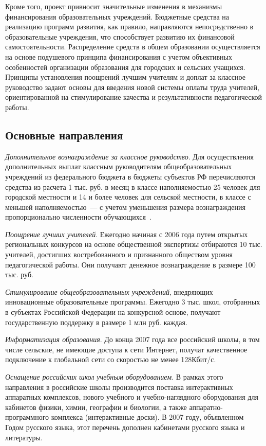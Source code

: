 \documentclass[article, 12pt, russian, oneside]{ncc}
\begin{document}
Кроме того, проект привносит значительные изменения в механизмы
финансирования образовательных учреждений. Бюджетные средства на
реализацию программ развития, как правило, направляются
непосредственно в образовательные учреждения, что способствует
развитию их финансовой самостоятельности. Распределение средств в
общем образовании осуществляется на основе подушевого принципа
финансирования с учетом объективных особенностей организации
образования для городских и сельских учащихся. Принципы установления
поощрений лучшим учителям и доплат за классное руководство задают
основы для введения новой системы оплаты труда учителей,
ориентированной на стимулирование качества и результативности
педагогической работы.

\subsection{Основные направления}

\emph{Дополнительное вознаграждение за классное руководство}. Для
осуществления дополнительных выплат классным руководителям
общеобразовательных учреждений из федерального бюджета в бюджеты
субъектов РФ перечисляются средства из расчета 1 тыс. руб. в месяц в
классе наполняемостью 25 человек для городской местности и 14 и более
человек для сельской местности, в классе с меньшей наполняемостью~---
с учетом уменьшения размера вознаграждения пропорционально численности
обучающихся~\cite{Edu_Goals}.

\emph{Поощрение лучших учителей}. Ежегодно начиная с 2006 года путем
открытых региональных конкурсов на основе общественной экспертизы
отбираются 10 тыс. учителей, достигших востребованного и признанного
обществом уровня педагогической работы. Они получают денежное
вознаграждение в размере 100 тыс. руб.

\emph{Стимулирование общеобразовательных учреждений}, внедряющих
инновационные образовательные программы. Ежегодно 3 тыс. школ,
отобранных в субъектах Российской Федерации на конкурсной основе,
получают государственную поддержку в размере 1 млн руб. каждая.

\emph{Информатизация образования}. До конца 2007 года все российский
школы, в том числе сельские, не имеющие доступа к сети Интернет,
получат качественное подключение к глобальной сети со скоростью не
менее 128Кбит/с.

\emph{Оснащение российских школ учебным оборудованием}. В рамках
этого направления в российские школы производится поставка
интерактивных аппаратных комплексов, нового учебного и
учебно-наглядного оборудования для кабинетов физики, химии, географии
и биологии, а также аппаратно-программного комплекса (интерактивные
доски). В 2007 году, объявленном Годом русского языка, этот перечень
дополнен кабинетами русского языка и литературы.
\end{document}
